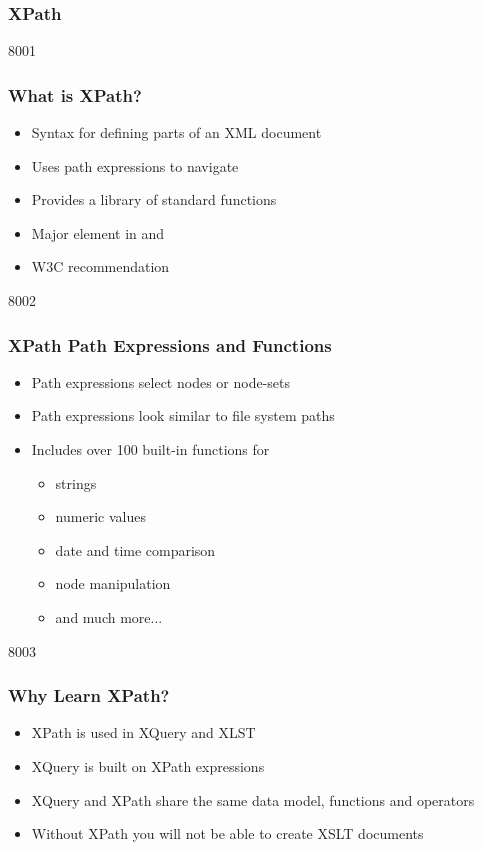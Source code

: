 \label{xpath}
\subsubsection{XPath}

\begin{slide}{8001}
\frametitle{What is XPath?}
\begin{itemize}
\item Syntax for defining parts of an XML document
\item Uses path expressions to navigate
\item Provides a library of standard functions
\item Major element in  and 
\item W3C recommendation
\end{itemize}
\end{slide}


\begin{slide}{8002}
\frametitle{XPath Path Expressions and Functions}
\begin{itemize}
\item Path expressions select nodes or node-sets
\item Path expressions look similar to file system paths
\item Includes over 100 built-in functions for
\begin{itemize}
 \item strings
 \item numeric values
 \item date and time comparison
 \item node manipulation
 \item and much more...
\end{itemize}
\end{itemize}
\end{slide}


\begin{slide}{8003}
\frametitle{Why Learn XPath?}
\begin{itemize}
\item XPath is used in XQuery and XLST
\item XQuery is built on XPath expressions
\item XQuery and XPath share the same data model, functions and operators
\item Without XPath you will not be able to create XSLT documents
\end{itemize}
\end{slide}


